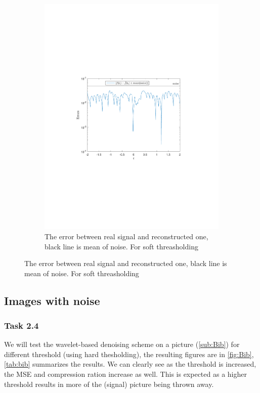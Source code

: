 \documentclass[a4paper]{article}
\begin{document}
\begin{figure}[H]
\begin{subfigure}{0.49\textwidth}
\includegraphics[trim={3.5cm 8cm 4cm 9cm},clip,width=1\textwidth]{Images/DeltaOptiSoft.pdf}
\caption{The error between real signal and reconstructed one, black line is mean of noise. For soft threasholding}
\label{sub:BestDeltaSoft}
\end{subfigure}
\end{figure}

    \subsection{Images with noise}

    \subsubsection{Task 2.4}

	We will test the wavelet-based denoising scheme on a picture (\cref{sub:Bib}) for different threshold (using hard thesholding), the resulting figures are in \cref{fig:Bib}, \cref{tab:bib} summarizes the results. We can clearly see as the threshold is increased, the MSE and compression ration increase as well. This is expected as a higher threshold results in more of the (signal) picture being thrown away.
\end{document}
